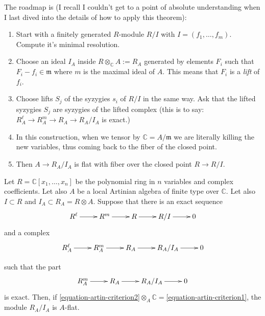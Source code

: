 \noindent
The roadmap is
(I recall I couldn't get to a point
of absolute understanding when I last
dived into the details of
how to apply this theorem):
\begin{enumerate}
\item Start with a finitely generated
$R$-module $R/I$ with $I = (f_1,…,f_m)$.
Compute it's minimal resolution.

\item Choose an ideal $I_A$ inside
$R \otimes_\mathbb{C} A := R_A$
generated by elements $F_i$
such that $F_i-f_i \in \mathfrak{m}$
where $m$ is the maximal ideal of $A$.
This means that $F_i$ is a {\it lift} of
$f_i$.

\item Choose lifts $S_j$ of the syzygies
$s_i$ of $R/I$ in the same way.
Ask that the lifted syzygies $S_j$
are syzygies of the lifted complex
(this is to say:
$R^\ell_A \to R^m_A\to R_A \to R_A/I_A$
is exact.)

\item In this construction, when we tensor
by  $\mathbb{C}=A/\mathfrak{m}$
we are literally killing the new variables,
thus coming back to the fiber of
the closed point.

\item Then $A \to R_A/I_A$ is flat
with fiber over the closed point
$R \to R/I$.
\end{enumerate}

\begin{theorem}
\label{theorem-artin-criterion}
Let $R=\mathbb{C}[x_1,…,x_n]$ be the polynomial ring
in $n$ variables and complex coefficients.
Let also $A$ be a local Artinian algebra of finite type over $\mathbb{C}$.
Let also $I \subset R$ and $I_A \subset R_A=R\otimes A$.
Suppose that there is an exact sequence
\begin{equation}
\label{equation-artin-criterion1}
\xymatrix{
R^\ell\ar[r]
&R^m\ar[r]
&R\ar[r]
&R/I\ar[r]
&0
}
\end{equation}
\noindent
and a complex
\begin{equation}
\label{equation-artin-criterion2}
\xymatrix{
R^\ell_A\ar[r]
&R^m_A\ar[r]
&R_A\ar[r]
&R_A/I_A\ar[r]
&0
}
\end{equation}

\noindent
such that the part
$$
\xymatrix{
R^m_A\ar[r]
&R_A\ar[r]
&R_A/I_A\ar[r]
&0
}
$$
is exact. Then, if
\ref{equation-artin-criterion2}$\otimes_A\mathbb{C}
=$\ref{equation-artin-criterion1},
the module $R_A/I_A$ is $A$-flat.
\end{theorem}

